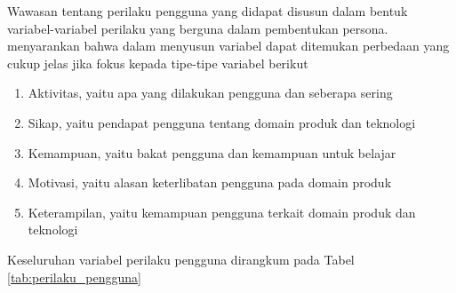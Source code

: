 Wawasan tentang perilaku pengguna yang didapat disusun dalam bentuk variabel-variabel perilaku yang berguna dalam pembentukan persona. \textcite{cooper2014face} menyarankan bahwa dalam menyusun variabel dapat ditemukan perbedaan yang cukup jelas jika fokus kepada tipe-tipe variabel berikut
\begin{enumerate}
  \item Aktivitas, yaitu apa yang dilakukan pengguna dan seberapa sering 
  \item Sikap, yaitu pendapat pengguna tentang domain produk dan teknologi
  \item Kemampuan, yaitu bakat pengguna dan kemampuan untuk belajar
  \item Motivasi, yaitu alasan keterlibatan pengguna pada domain produk 
  \item Keterampilan, yaitu kemampuan pengguna terkait domain produk dan teknologi
\end{enumerate}

Keseluruhan variabel perilaku pengguna dirangkum pada Tabel \ref{tab:perilaku_pengguna}

\newpage

